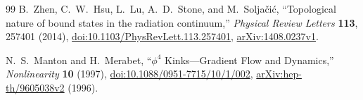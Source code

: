 \begin{thebibliography}{99}
B.~Zhen, C.~W.~Hsu, L.~Lu, A.~D.~Stone, and M.~Solja\v{c}i\'c,
``Topological nature of bound states in the radiation continuum,''
\emph{Physical Review Letters} \textbf{113}, 257401 (2014),
\href{https://doi.org/10.1103/PhysRevLett.113.257401}{doi:10.1103/PhysRevLett.113.257401},
\href{https://arxiv.org/abs/1408.0237v1}{arXiv:1408.0237v1}.

N.~S.~Manton and H.~Merabet,
``$\phi^4$ Kinks---Gradient Flow and Dynamics,''
\emph{Nonlinearity} \textbf{10} (1997),
\href{https://doi.org/10.1088/0951-7715/10/1/002}{doi:10.1088/0951-7715/10/1/002},
\href{https://arxiv.org/abs/hep-th/9605038v2}{arXiv:hep-th/9605038v2} (1996).

\end{thebibliography}
